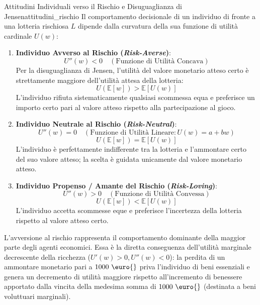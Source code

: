 \begin{teorema}{Attitudini Individuali verso il Rischio e Disuguaglianza di Jensen}{attitudini_rischio}
Il comportamento decisionale di un individuo di fronte a una lotteria rischiosa $L$ dipende dalla curvatura della sua funzione di utilità cardinale $U(w)$:
\begin{enumerate}
    \item \textbf{Individuo Avverso al Rischio (\textit{Risk-Averse})}:
    \begin{equation}
        U''(w) < 0 \quad (\text{Funzione di Utilità Concava})
    \end{equation}
    Per la disuguaglianza di Jensen, l'utilità del valore monetario atteso certo è strettamente maggiore dell'utilità attesa della lotteria:
    \begin{equation}
        U(\mathbb{E}[w]) > \mathbb{E}[U(w)]
    \end{equation}
    L'individuo rifiuta sistematicamente qualsiasi scommessa equa e preferisce un importo certo pari al valore atteso rispetto alla partecipazione al gioco.
    
    \item \textbf{Individuo Neutrale al Rischio (\textit{Risk-Neutral})}:
    \begin{equation}
        U''(w) = 0 \quad (\text{Funzione di Utilità Lineare}: U(w) = a + bw)
    \end{equation}
    \begin{equation}
        U(\mathbb{E}[w]) = \mathbb{E}[U(w)]
    \end{equation}
    L'individuo è perfettamente indifferente tra la lotteria e l'ammontare certo del suo valore atteso; la scelta è guidata unicamente dal valore monetario atteso.
    
    \item \textbf{Individuo Propenso / Amante del Rischio (\textit{Risk-Loving})}:
    \begin{equation}
        U''(w) > 0 \quad (\text{Funzione di Utilità Convessa})
    \end{equation}
    \begin{equation}
        U(\mathbb{E}[w]) < \mathbb{E}[U(w)]
    \end{equation}
    L'individuo accetta scommesse eque e preferisce l'incertezza della lotteria rispetto al valore atteso certo.
\end{enumerate}
\end{teorema}

\begin{osservazione}
L'avversione al rischio rappresenta il comportamento dominante della maggior parte degli agenti economici. Essa è la diretta conseguenza dell'utilità marginale decrescente della ricchezza ($U'(w) > 0, U''(w) < 0$): la perdita di un ammontare monetario pari a $1000\text{ \euro{}}$ priva l'individuo di beni essenziali e genera un decremento di utilità maggiore rispetto all'incremento di benessere apportato dalla vincita della medesima somma di $1000\text{ \euro{}}$ (destinata a beni voluttuari marginali).
\end{osservazione}

